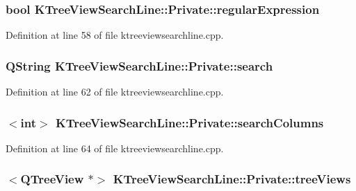 \hypertarget{classKTreeViewSearchLine_1_1Private_ab02ea0ecfae43ab59884906e98e1468e}{
\subsubsection[{regular\+Expression}]{\setlength{\rightskip}{0pt plus 5cm}bool K\+Tree\+View\+Search\+Line\+::\+Private\+::regular\+Expression}}\label{classKTreeViewSearchLine_1_1Private_ab02ea0ecfae43ab59884906e98e1468e}


Definition at line 58 of file ktreeviewsearchline.\+cpp.

\hypertarget{classKTreeViewSearchLine_1_1Private_aff7b4392b7cf091307c4e62c69556929}{
\subsubsection[{search}]{\setlength{\rightskip}{0pt plus 5cm}Q\+String K\+Tree\+View\+Search\+Line\+::\+Private\+::search}}\label{classKTreeViewSearchLine_1_1Private_aff7b4392b7cf091307c4e62c69556929}


Definition at line 62 of file ktreeviewsearchline.\+cpp.

\hypertarget{classKTreeViewSearchLine_1_1Private_a2e8b3ddf8c1f4a5812f863eda57188d6}{
\subsubsection[{search\+Columns}]{$<$int$>$ K\+Tree\+View\+Search\+Line\+::\+Private\+::search\+Columns}}\label{classKTreeViewSearchLine_1_1Private_a2e8b3ddf8c1f4a5812f863eda57188d6}


Definition at line 64 of file ktreeviewsearchline.\+cpp.

\hypertarget{classKTreeViewSearchLine_1_1Private_a1cc9fa46d2d3b371f075b8beea071555}{
\subsubsection[{tree\+Views}]{$<$Q\+Tree\+View $\ast$$>$ K\+Tree\+View\+Search\+Line\+::\+Private\+::tree\+Views}}\label{classKTreeViewSearchLine_1_1Private_a1cc9fa46d2d3b371f075b8beea071555}



